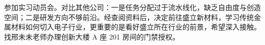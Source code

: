参加实习动员会。对比其他公司：一是任务分配过于流水线化，缺乏自由度与创造空间；二是研发方向不够前沿。经查阅资料后，决定前往盛立新材料，学习传统金属材料如何切入电子行业，更重要的是看好盛立所在行业的前景，希望深入接触。
找邢未未老师办理创新大楼 A 座 201 房间的门禁授权。
